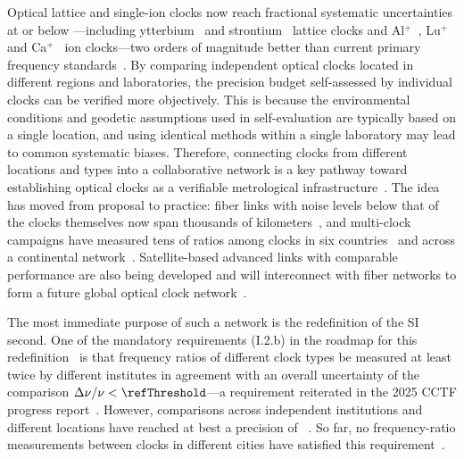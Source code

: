 Optical lattice and single-ion clocks now reach fractional systematic
uncertainties at or below \selfEvalBound---including
ytterbium~\citep{mcgrew2018geodesy, zhu2026yb} and
strontium~\citep{aeppli2024sr, jia2026sr, lu2025ntsc} lattice clocks
and Al$^+$~\citep{marshall2025alplus, dawel2026ptbalplus},
Lu$^+$~\citep{arnold2026lu} and Ca$^+$~\citep{zhang2026ca} ion
clocks---two orders of magnitude better
than current primary frequency standards~\citep{heavner2014nistf2,
weyers2018ptbcsf}. By
comparing independent optical clocks located in different regions and
laboratories, the precision budget self-assessed by individual clocks
can be verified more objectively. This is because the environmental
conditions and geodetic assumptions used in self-evaluation are
typically based on a single location, and using identical methods within
a single laboratory may lead to common systematic biases. Therefore,
connecting clocks from different locations and types into a
collaborative network is a key pathway toward establishing optical
clocks as a verifiable metrological
infrastructure~\citep{riehle2017networks, komar2014quantumnetwork}. The
idea has moved from proposal to practice: fiber links with noise levels
below that of the clocks themselves now span thousands of
kilometers~\citep{schioppo2022cavities, chen2026dissemination}, and
multi-clock campaigns have measured tens of ratios among clocks in six
countries~\citep{lindvall2025coordinated} and across a continental
network~\citep{pizzocaro2026european}. Satellite-based advanced links
with comparable performance are also being developed and will
interconnect with fiber networks to form a future global optical clock
network~\citep{shen2021satellite, caldwell2023geo, shen2022freespace}.

The most immediate purpose of such a network is the redefinition of the
SI second. One of the mandatory requirements (I.2.b) in the roadmap for
this redefinition~\citep{dimarcq2024roadmap} is that frequency ratios of
different clock types be measured at least twice by different institutes
in agreement with an overall uncertainty of the comparison
$\Delta\nu/\nu < \refThreshold$---a requirement reiterated in the 2025
CCTF progress report~\citep{cctf2025strategy, cctf2025taskforce}.
However, comparisons across independent institutions and different
locations have reached at best a precision of
~\citep{pizzocaro2026european}. So far, no frequency-ratio
measurements between clocks in different cities have satisfied this
requirement~\citep{fortier2026review}.

